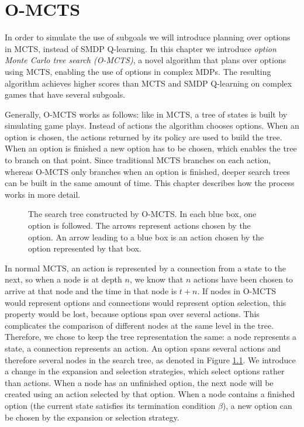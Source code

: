 \chapter{O-MCTS}
\label{sec:planning}

In order to simulate the use of subgoals we will introduce planning over
options in MCTS, instead of SMDP Q-learning. In this chapter we introduce
\emph{option Monte Carlo tree search (O-MCTS)}, a novel algorithm that plans
over options using MCTS, enabling the use of options in complex MDPs. The
resulting algorithm achieves higher scores than MCTS and SMDP Q-learning on
complex games that have several subgoals.

Generally, O-MCTS works as follows: like in MCTS, a tree of states is
built by simulating game plays. Instead of actions the algorithm chooses
options. When an option is chosen, the actions returned by its policy are used
to build the tree. When an option is finished a new option has to be chosen,
which enables the tree to branch on that point. Since traditional MCTS branches
on each action, whereas O-MCTS only branches when an option is finished, deeper
search trees can be built in the same amount of time. This chapter describes
how the process works in more detail.


\begin{figure}
	\centering
	\caption{The search tree constructed by O-MCTS. In each blue box, one option
	is followed. The arrows represent actions chosen by the option. An arrow
leading to a blue box is an action chosen by the option represented by that box.}
	\label{fig:omcts-tree}
\end{figure}

In normal MCTS, an action is represented by a connection from a state to the
next, so when a node is at depth $n$, we know that $n$ actions have been chosen
to arrive at that node and the time in that node is $t+n$. If nodes in O-MCTS
would represent options and connections would represent option selection, this
property would be lost, because options span over several actions. This
complicates the comparison of different nodes at the same level in the tree.
Therefore, we chose to keep the tree representation the same: a node represents
a state, a connection represents an action. An option spans several actions and
therefore several nodes in the search tree, as denoted in Figure
\ref{fig:omcts-tree}. We introduce a change in the expansion and selection
strategies, which select options rather than actions. When a node has an
unfinished option, the next node will be created using an action selected by
that option. When a node contains a finished option (the current state satisfies
its termination condition $\beta$), a new option can be chosen by the expansion
or selection strategy.


